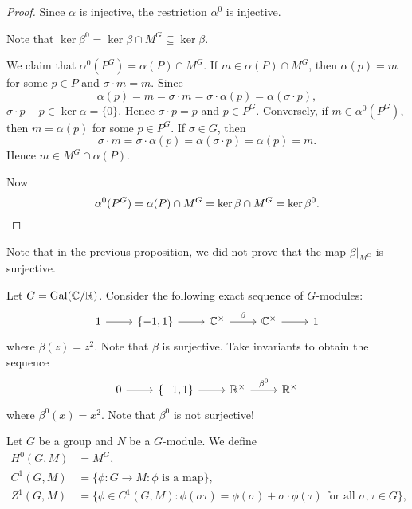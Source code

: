 \begin{proof}
    Since $\alpha$ is injective, the restriction $\alpha^0$ is injective. 

    Note that 
    $\ker\beta^0=\ker\beta\cap M^G\subseteq\ker\beta$. 
    
    We claim 
    that $\alpha^0(P^G)=\alpha(P)\cap M^G$. If $m\in\alpha(P)\cap M^G$, then 
    $\alpha(p)=m$ for some $p\in P$ and $\sigma\cdot m=m$. Since
    \[
    \alpha(p)=m=\sigma\cdot m=\sigma\cdot\alpha(p)=\alpha(\sigma\cdot p),
    \]
    $\sigma\cdot p-p\in\ker\alpha=\{0\}$. Hence $\sigma\cdot p=p$ and
    $p\in P^G$. Conversely, if $m\in\alpha^0(P^G)$, then 
    $m=\alpha(p)$ for some $p\in P^G$. If $\sigma\in G$, then
    \[
    \sigma\cdot m=\sigma\cdot\alpha(p)=\alpha(\sigma\cdot p)=\alpha(p)=m.
    \]
    Hence $m\in M^G\cap\alpha(P)$.

    Now
    \[
    \alpha^0(P^G)=\alpha(P)\cap M^G=\ker\beta\cap M^G=\ker\beta^0.\qedhere  
    \]
\end{proof}

Note that in the previous proposition, we did not prove that
the map $\beta|_{M^G}$ is surjective. 

\begin{example}
    Let $G=\operatorname{Gal}(\mathbb{C}/\mathbb{R})$. Consider the following exact sequence
    of $G$-modules:
    \[
    \begin{tikzcd}
    1 & \{-1,1\} & \C^\times & \C^\times & 1
    \arrow[from=1-1, to=1-2]
    \arrow[from=1-2, to=1-3]
    \arrow["\beta", from=1-3, to=1-4]
    \arrow[from=1-4, to=1-5]
    \end{tikzcd}    
    \]
    where $\beta(z)=z^2$. Note that $\beta$ is surjective. Take invariants 
    to obtain the sequence  
    \[
    \begin{tikzcd}
     0 & \{-1,1\} & \R^\times & \R^\times 
     \arrow[from=1-1, to=1-2]
     \arrow[from=1-2, to=1-3]
     \arrow["\beta^0", from=1-3, to=1-4]
     \end{tikzcd}
     \]
     where $\beta^0(x)=x^2$. Note that $\beta^0$ is not surjective! 
\end{example}

\begin{definition}
    Let $G$ be a group and $N$ be a $G$-module. 
    We define 
    \begin{align*}
        H^0(G,M)&=M^G,\\
        C^1(G,M)&=\{\phi\colon G\to M:\phi\text{ is a map}\},\\
        Z^1(G,M)&=\{\phi\in C^1(G,M):\phi(\sigma\tau)=\phi(\sigma)+\sigma\cdot\phi(\tau)\text{ for all $\sigma,\tau\in G$}\},
        \end{align*}    
\end{definition}

